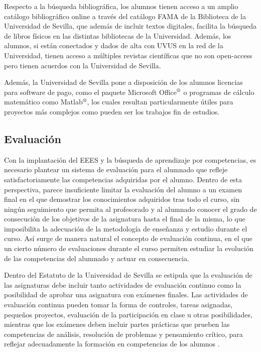 \documentclass[a4paper,12pt,twoside]{article}
\begin{document}
Respecto a la búsqueda bibliográfica, los alumnos tienen acceso a un amplio catálogo bibliográfico online a través del catálogo FAMA de la Biblioteca de la Universidad de Sevilla, que además de incluir textos digitales, facilita la búsqueda de libros físicos en las distintas bibliotecas de la Universidad. Además, los alumnos, si están conectados y dados de alta con UVUS en la red de la Universidad, tienen acceso a múltiples revistas científicas que no son open-access pero tienen acuerdos con la Universidad de Sevilla.

Además, la Universidad de Sevilla pone a disposición de los alumnos licencias para software de pago, como el paquete Microsoft Office$^\text{\textregistered}$ o programas de cálculo matemático como Matlab$^\text{\textregistered}$, los cuales resultan particularmente útiles para proyectos más complejos como pueden ser los trabajos fin de estudios.

\subsection{Evaluación}

Con la implantación del EEES y la búsqueda de aprendizaje por competencias, es necesario plantear un sistema de evaluación para el alumnado que refleje satisfactoriamente las competencias adquiridas por el alumno. Dentro de esta perspectiva, parece insuficiente limitar la evaluación del alumno a un examen final en el que demostrar los conocimientos adquiridos tras todo el curso, sin ningún seguimiento que permita al profesorado y al alumnado conocer el grado de consecución de los objetivos de la asignatura hasta el final de la misma, lo que imposibilita la adecuación de la metodología de enseñanza y estudio durante el curso. Así surge de manera natural el concepto de evaluación continua, en el que un cierto número de evaluaciones durante el curso permiten estudiar la evolución de las competencias del alumnado y actuar en consecuencia.

Dentro del Estatuto de la Universidad de Sevilla se estipula que la evaluación de las asignaturas debe incluir tanto actividades de evaluación continuo como la posibilidad de aprobar una asignatura con exámenes finales. Las actividades de evaluación continua pueden tomar la forma de controles, tareas asignadas, pequeños proyectos, evaluación de la participación en clase u otras posibilidades, mientras que los exámenes deben incluir partes prácticas que prueben las competencias de análisis, resolución de problemas y pensamiento crítico, para reflejar adecuadamente la formación en competencias de los alumnos .
\end{document}
